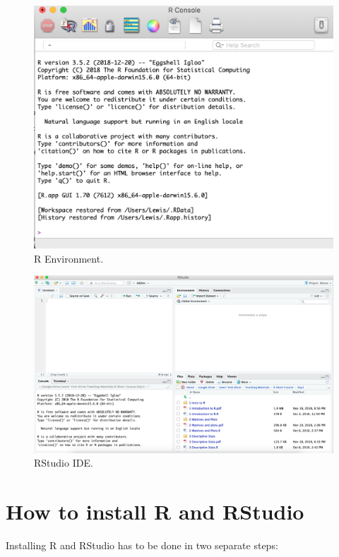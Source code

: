 \documentclass[
]{book}
\theoremstyle{definition}
\theoremstyle{definition}
\theoremstyle{definition}
\theoremstyle{definition}
\theoremstyle{remark}
\begin{document}
\begin{figure}

{\centering \includegraphics[width=0.7\linewidth]{Figures/R} 

}

\caption{R Environment.}\label{fig:R}
\end{figure}
\begin{figure}

{\centering \includegraphics[width=0.7\linewidth]{Figures/RStudio} 

}

\caption{RStudio IDE.}\label{fig:RStudio}
\end{figure}

\hypertarget{how-to-install-r-and-rstudio}{%
\section{How to install R and RStudio}\label{how-to-install-r-and-rstudio}}

Installing R and RStudio has to be done in two separate steps:
\end{document}
